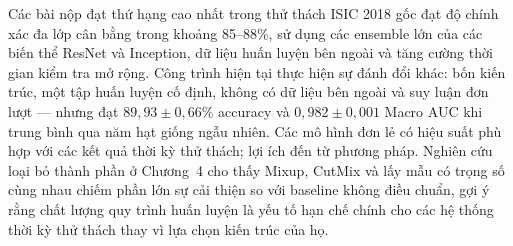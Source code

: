 Các bài nộp đạt thứ hạng cao nhất trong thử thách ISIC 2018 gốc đạt độ chính xác đa lớp cân bằng trong khoảng 85--88\%, sử dụng các ensemble lớn của các biến thể ResNet và Inception, dữ liệu huấn luyện bên ngoài và tăng cường thời gian kiểm tra mở rộng. Công trình hiện tại thực hiện sự đánh đổi khác: bốn kiến trúc, một tập huấn luyện cố định, không có dữ liệu bên ngoài và suy luận đơn lượt --- nhưng đạt $89{,}93 \pm 0{,}66\%$ accuracy và $0{,}982 \pm 0{,}001$ Macro AUC khi trung bình qua năm hạt giống ngẫu nhiên. Các mô hình đơn lẻ có hiệu suất phù hợp với các kết quả thời kỳ thử thách; lợi ích đến từ phương pháp. Nghiên cứu loại bỏ thành phần ở Chương~4 cho thấy Mixup, CutMix và lấy mẫu có trọng số cùng nhau chiếm phần lớn sự cải thiện so với baseline không điều chuẩn, gợi ý rằng chất lượng quy trình huấn luyện là yếu tố hạn chế chính cho các hệ thống thời kỳ thử thách thay vì lựa chọn kiến trúc của họ.
